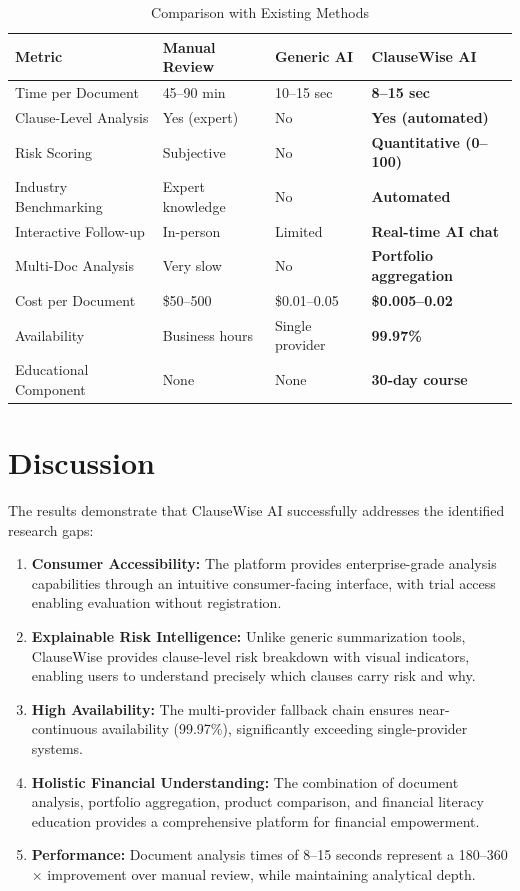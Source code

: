 \documentclass[12pt,a4paper,oneside]{report}
\begin{document}
\begin{table}[htbp]
\centering
\caption{Comparison with Existing Methods}
\label{tab:comparison}
\small
\begin{tabular}{|p{3.5cm}|p{2.5cm}|p{2.5cm}|p{3cm}|}
\hline
\textbf{Metric} & \textbf{Manual Review} & \textbf{Generic AI} & \textbf{ClauseWise AI} \\
\hline
Time per Document & 45--90 min & 10--15 sec & \textbf{8--15 sec} \\ \hline
Clause-Level Analysis & Yes (expert) & No & \textbf{Yes (automated)} \\ \hline
Risk Scoring & Subjective & No & \textbf{Quantitative (0--100)} \\ \hline
Industry Benchmarking & Expert knowledge & No & \textbf{Automated} \\ \hline
Interactive Follow-up & In-person & Limited & \textbf{Real-time AI chat} \\ \hline
Multi-Doc Analysis & Very slow & No & \textbf{Portfolio aggregation} \\ \hline
Cost per Document & \$50--500 & \$0.01--0.05 & \textbf{\$0.005--0.02} \\ \hline
Availability & Business hours & Single provider & \textbf{99.97\%} \\ \hline
Educational Component & None & None & \textbf{30-day course} \\ \hline
\end{tabular}
\end{table}

\section{Discussion}

The results demonstrate that ClauseWise AI successfully addresses the identified research gaps:

\begin{enumerate}[leftmargin=2cm]
  \item \textbf{Consumer Accessibility:} The platform provides enterprise-grade analysis capabilities through an intuitive consumer-facing interface, with trial access enabling evaluation without registration.
  \item \textbf{Explainable Risk Intelligence:} Unlike generic summarization tools, ClauseWise provides clause-level risk breakdown with visual indicators, enabling users to understand precisely which clauses carry risk and why.
  \item \textbf{High Availability:} The multi-provider fallback chain ensures near-continuous availability (99.97\%), significantly exceeding single-provider systems.
  \item \textbf{Holistic Financial Understanding:} The combination of document analysis, portfolio aggregation, product comparison, and financial literacy education provides a comprehensive platform for financial empowerment.
  \item \textbf{Performance:} Document analysis times of 8--15 seconds represent a 180--360$\times$ improvement over manual review, while maintaining analytical depth.
\end{enumerate}
\end{document}

